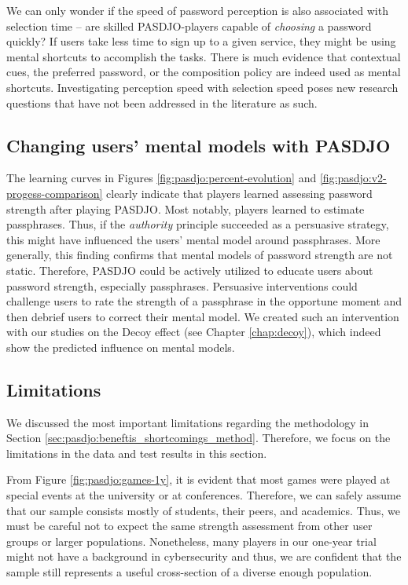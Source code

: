 We can only wonder if the speed of password perception is also associated with selection time -- are skilled PASDJO-players capable of \textit{choosing} a password quickly? If users take less time to sign up to a given service, they might be using mental shortcuts to accomplish the tasks. There is much evidence that contextual cues, the preferred password, or the composition policy are indeed used as mental shortcuts. Investigating perception speed with selection speed poses new research questions that have not been addressed in the literature as such. 

\subsection{Changing users' mental models with PASDJO}
The learning curves in Figures \ref{fig:pasdjo:percent-evolution} and \ref{fig:pasdjo:v2-progess-comparison} clearly indicate that players learned assessing password strength after playing PASDJO. Most notably, players learned to estimate passphrases. Thus, if the \textit{authority} principle succeeded as a persuasive strategy, this might have influenced the users' mental model around passphrases. More generally, this finding confirms that mental models of password strength are not static. Therefore, PASDJO could be actively utilized to educate users about password strength, especially passphrases. Persuasive interventions could challenge users to rate the strength of a passphrase in the opportune moment and then debrief users to correct their mental model. We created such an intervention with our studies on the Decoy effect (see Chapter \ref{chap:decoy}), which indeed show the predicted influence on mental models. 

\subsection{Limitations}
We discussed the most important limitations regarding the methodology in Section \ref{sec:pasdjo:beneftis_shortcomings_method}. Therefore, we focus on the limitations in the data and test results in this section. 

From Figure \ref{fig:pasdjo:games-1y}, it is evident that most games were played at special events at the university or at conferences. Therefore, we can safely assume that our sample consists mostly of students, their peers, and academics. Thus, we must be careful not to expect the same strength assessment from other user groups or larger populations. Nonetheless, many players in our one-year trial might not have a background in cybersecurity and thus, we are confident that the sample still represents a useful cross-section of a diverse enough population. 

